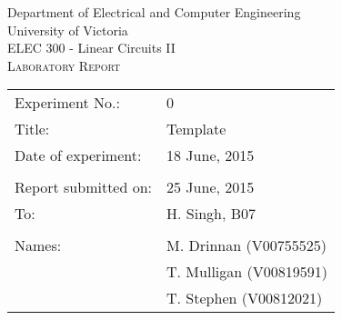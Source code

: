 \begin{titlepage}

\begin{center}
	\begin{LARGE}
		Department of Electrical and Computer Engineering \\
		University of Victoria \\
		ELEC 300 - Linear Circuits II \\[1cm]
		\textsc{Laboratory Report}
		\\[1cm]
	\end{LARGE}
\end{center}

\begin{tabular}{ p{} p{} }
	Experiment No.: & 0 \\ 
	Title: & Template \\ 
	Date of experiment:& 18 June, 2015 \\ 
	& \\
	Report submitted on:& 25 June, 2015 \\ 
	To: & H. Singh, B07 \\ 
	& \\
	Names: & M. Drinnan (V00755525)\\
	& T. Mulligan (V00819591) \\
	& T. Stephen (V00812021)  
\end{tabular}

\end{titlepage}
